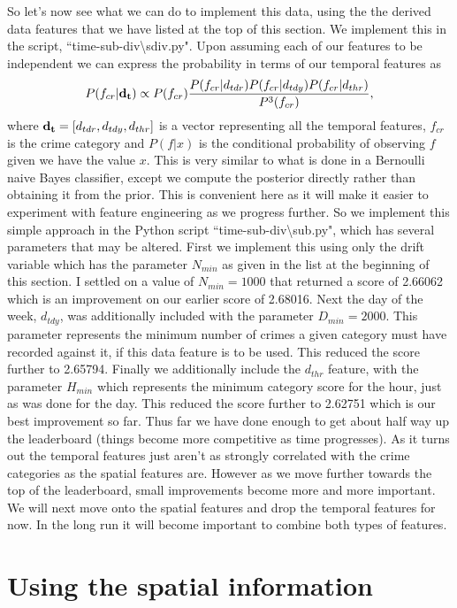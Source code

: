 \documentclass[12pt,notitlepage]{article}
\begin{document}
So let's now see what we can do to implement this data, using the the derived data features that we have listed at the top of this section. We implement this in the script, ``time-sub-div\textbackslash sdiv.py". Upon  assuming each of our features to be independent we can express the probability in terms of our temporal features as
%
\begin{equation}
P(f_{cr}|{\bf d_t})  \propto P(f_{cr}) \frac{P(f_{cr}|d_{tdr})P(f_{cr}|d_{tdy})P(f_{cr}|d_{thr})}{P^3(f_{cr})},
\end{equation}
where ${\bf d_t} = [d_{tdr},d_{tdy},d_{thr}]$ is a vector representing all the temporal features, $f_{cr}$  is the crime category and $P(f|x)$ is the conditional probability of observing $f$ given we have the value $x$. This is very similar to what is done in a Bernoulli naive Bayes classifier, except we compute the posterior directly rather than obtaining it from the prior. This is convenient here as it will make it easier to experiment with feature engineering as we progress further.
	So we implement this simple approach in the Python script ``time-sub-div\textbackslash sub.py", which has several parameters that may be altered. First we implement this using only the drift variable which has the parameter $N_{min}$ as given in the list at the beginning of this section. I settled on a value of $N_{min} = 1000$ that returned a score of 2.66062 which is an improvement on our earlier score of 2.68016. Next the day of the week, $d_{tdy}$, was additionally included with the parameter $D_{min}=2000$. This parameter represents the minimum number of crimes a given category must have recorded against it, if this data feature is to be used. This reduced the score further to 2.65794. Finally we additionally include the $d_{thr}$ feature, with the parameter $H_{min}$ which represents the minimum category score for the hour, just as was done for the day. This reduced the score further to 2.62751 which is our best improvement so far. 
	Thus far we have done enough to get about half way up the leaderboard (things become more competitive as time progresses). As it turns out the temporal features just aren't as strongly correlated with the crime categories as the spatial features are. However as we move further towards the top of the leaderboard, small improvements become more and more important. We will next move onto the spatial features and drop the temporal features for now. In the long run it will become important to combine both types of features.

\section{Using the spatial information}
\end{document}
